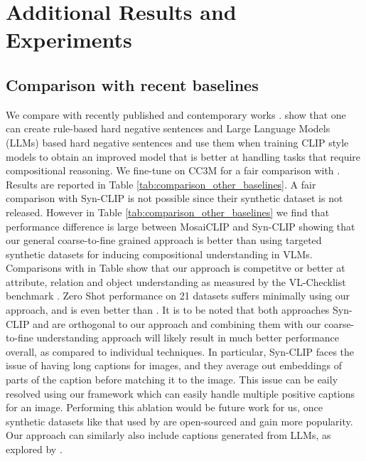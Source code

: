 \documentclass[11pt]{article}
\newcommand{\methodcomp}{MosaiCLIP}
\begin{document}
\section{Additional Results and Experiments}
\label{additional_expt_results}

\subsection{Comparison with recent baselines}
\label{comparison_other_baselines}
We compare with recently published and contemporary works \citep{cascantebonilla2023going, doveh2023teaching}. \citet{doveh2023teaching} show that one can create rule-based hard negative sentences and Large Language Models (LLMs) based hard negative sentences and use them when training CLIP style models to obtain an improved model that is better at handling tasks that require compositional reasoning.
We fine-tune on CC3M \citep{sharma-etal-2018-conceptual} for a fair comparison with \citet{doveh2023teaching}. Results are reported in Table \ref{tab:comparison_other_baselines}. A fair comparison with Syn-CLIP \citet{cascantebonilla2023going} is not possible since their synthetic dataset is not released. However in Table \ref{tab:comparison_other_baselines} we find that performance difference is large between \methodcomp{} and Syn-CLIP showing that our general coarse-to-fine grained approach is better than using targeted synthetic datasets for inducing compositional understanding in VLMs. Comparisons with \citet{doveh2023teaching} in Table show that our approach is competitve or better at attribute, relation and object understanding as measured by the VL-Checklist benchmark \citep{zhao2022vlchecklist}. Zero Shot performance on 21 datasets suffers minimally using our approach, and is even better than \citep{zhao2022vlchecklist}. It is to be noted that both approaches Syn-CLIP \citep{cascantebonilla2023going} and \citet{doveh2023teaching} are orthogonal to our approach and combining them with our coarse-to-fine understanding approach will likely result in much better performance overall, as compared to individual techniques. In particular, Syn-CLIP \citep{cascantebonilla2023going} faces the issue of having long captions for images, and they average out embeddings of parts of the caption before matching it to the image. This issue can be eaily resolved using our framework which can easily handle multiple positive captions for an image. Performing this ablation would be future work for us, once synthetic datasets like that used by \citet{cascantebonilla2023going} are open-sourced and gain more popularity. Our approach can similarly also include captions generated from LLMs, as explored by \citet{doveh2023teaching}.
\end{document}
